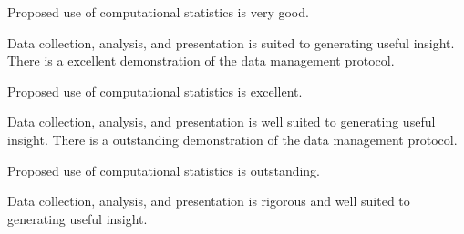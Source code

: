 \begin{markingrubric}
            \par Proposed use of computational statistics is very good.
            \par Data collection, analysis, and presentation is suited to generating useful insight.
        \grade There is a excellent demonstration of the data management protocol.
            \par Proposed use of computational statistics is excellent.
            \par Data collection, analysis, and presentation is well suited to generating useful insight.
        \grade There is a outstanding demonstration of the data management protocol.
            \par Proposed use of computational statistics is outstanding.
            \par Data collection, analysis, and presentation is rigorous and well suited to generating useful insight.
\end{markingrubric}



\rubricyearthree
{}
	
